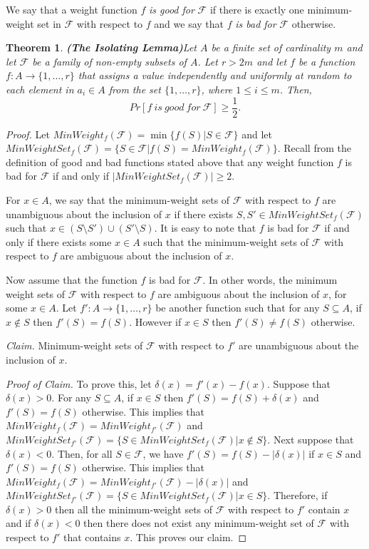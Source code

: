 \documentclass{amsbook}
\newtheorem{theorem}{Theorem}[chapter]
\theoremstyle{definition}
\theoremstyle{remark}
\numberwithin{section}{chapter}
\numberwithin{equation}{chapter}
\newcommand{\F}{\mathcal{F}}
\begin{document}
We say that a weight function $f$\emph{ is good for }$\F$ if there is exactly one minimum-weight set in $\F$ with respect to $f$ and we say that $f$\emph{ is bad for }$\F$ otherwise.
\begin{theorem}{\textrm{\bf (The Isolating Lemma)}}\label{Isolating}
Let $A$ be a finite set of cardinality $m$ and let $\F$ be a family of non-empty subsets of $A$. Let $r>2m$ and let $f$ be a function $f:A\rightarrow\{1,\ldots ,r\}$ that assigns a value independently and uniformly at random to each element in $a_i\in A$ from the set $\{ 1,\ldots ,r\}$, where $1\leq i\leq m$. Then,
\[
Pr[f~is~good~for~\F ]\geq\frac{1}{2}.
\]
\end{theorem}
\begin{proof}
Let $MinWeight_f(\F )=\min \{f(S)|S\in\F\}$ and let $MinWeightSet_f(\F )=\{S\in\F |f(S)=MinWeight_f(\F )\}$. Recall from the definition of good and bad functions stated above that any weight function $f$ is bad for $\F$ if and only if $|MinWeightSet_f(\F )|\geq 2$.

For $x\in A$, we say that the minimum-weight sets of $\F$ with respect to $f$ are unambiguous about the inclusion of $x$ if there exists $S,S'\in MinWeightSet_f(\F )$ such that $x\in (S\setminus S')\cup (S'\setminus S)$. It is easy to note that $f$ is bad for $\F$ if and only if there exists some $x\in A$ such that the minimum-weight sets of $\F$ with respect to $f$ are ambiguous about the inclusion of $x$.

Now assume that the function $f$ is bad for $\F$. In other words, the minimum weight sets of $\F$ with respect to $f$ are ambiguous about the inclusion of $x$, for some $x\in A$. Let $f':A\rightarrow \{ 1,\ldots, r\}$ be another function such that for any $S\subseteq A$, if $x\not\in S$ then $f'(S)=f(S)$. However if $x\in S$ then $f'(S)\neq f(S)$ otherwise. 

{\emph{Claim.}} Minimum-weight sets of $\F$ with respect to $f'$ are unambiguous about the inclusion of $x$.

{\emph{Proof of Claim.}}
To prove this, let $\delta (x)=f'(x)-f(x)$. Suppose that $\delta (x)>0$. For any $S\subseteq A$, if $x\in S$ then $f'(S)=f(S)+\delta (x)$ and $f'(S)=f(S)$ otherwise. This implies that $MinWeight_f(\F )=MinWeight_{f'}(\F )$ and $MinWeightSet_{f'}(\F )=\{ S\in MinWeightSet_f(\F )|x\not\in S\}$. Next suppose that $\delta (x)<0$. Then, for all $S\in \F$, we have $f'(S)=f(S)-|\delta (x)|$ if $x\in S$ and $f'(S)=f(S)$ otherwise. This implies that $MinWeight_f(\F )=MinWeight_{f'}(\F )-|\delta (x)|$ and $MinWeightSet_{f'}(\F )=\{ S\in MinWeightSet_f(\F )|x\in S\}$. Therefore, if $\delta (x)>0$ then all the minimum-weight sets of $\F$ with respect to $f'$ contain $x$ and if $\delta (x)<0$ then there does not exist any minimum-weight set of $\F$ with respect to $f'$ that contains $x$. This proves our claim.


\end{proof}
\end{document}
